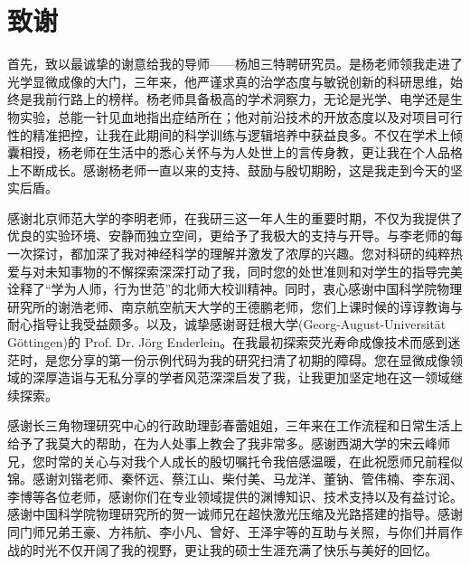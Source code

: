 \chapter[致谢]{致\quad 谢}%

首先，致以最诚挚的谢意给我的导师——杨旭三特聘研究员。是杨老师领我走进了光学显微成像的大门，三年来，他严谨求真的治学态度与敏锐创新的科研思维，始终是我前行路上的榜样。杨老师具备极高的学术洞察力，无论是光学、电学还是生物实验，总能一针见血地指出症结所在；他对前沿技术的开放态度以及对项目可行性的精准把控，让我在此期间的科学训练与逻辑培养中获益良多。不仅在学术上倾囊相授，杨老师在生活中的悉心关怀与为人处世上的言传身教，更让我在个人品格上不断成长。感谢杨老师一直以来的支持、鼓励与殷切期盼，这是我走到今天的坚实后盾。

感谢北京师范大学的李明老师，在我研三这一年人生的重要时期，不仅为我提供了优良的实验环境、安静而独立空间，更给予了我极大的支持与开导。与李老师的每一次探讨，都加深了我对神经科学的理解并激发了浓厚的兴趣。您对科研的纯粹热爱与对未知事物的不懈探索深深打动了我，同时您的处世准则和对学生的指导完美诠释了``学为人师，行为世范''的北师大校训精神。同时，衷心感谢中国科学院物理研究所的谢浩老师、南京航空航天大学的王德鹏老师，您们上课时候的谆谆教诲与耐心指导让我受益颇多。以及，诚挚感谢哥廷根大学(Georg-August-Universität Göttingen)的 Prof. Dr. Jörg Enderlein。在我最初探索荧光寿命成像技术而感到迷茫时，是您分享的第一份示例代码为我的研究扫清了初期的障碍。您在显微成像领域的深厚造诣与无私分享的学者风范深深启发了我，让我更加坚定地在这一领域继续探索。

感谢长三角物理研究中心的行政助理彭春蕾姐姐，三年来在工作流程和日常生活上给予了我莫大的帮助，在为人处事上教会了我非常多。感谢西湖大学的宋云峰师兄，您时常的关心与对我个人成长的殷切嘱托令我倍感温暖，在此祝愿师兄前程似锦。感谢刘锴老师、秦怀远、蔡江山、柴付美、马龙洋、董钠、管伟楠、李东润、李博等各位老师，感谢你们在专业领域提供的渊博知识、技术支持以及有益讨论。感谢中国科学院物理研究所的贺一诚师兄在超快激光压缩及光路搭建的指导。感谢同门师兄弟王豪、方祎航、李小凡、曾好、王泽宇等的互助与关照，与你们并肩作战的时光不仅开阔了我的视野，更让我的硕士生涯充满了快乐与美好的回忆。

